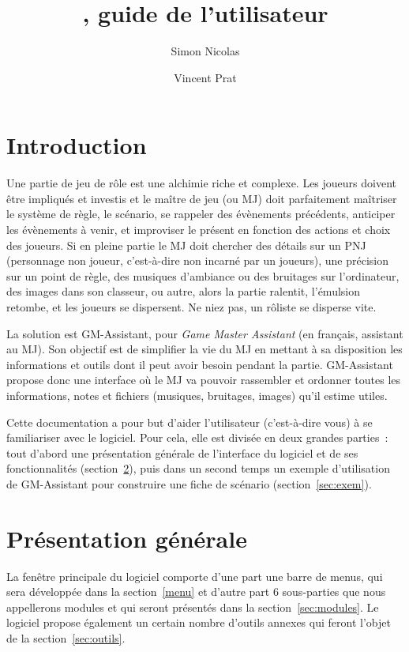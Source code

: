 \documentclass[a4paper,12pt]{article}
\title{\GMA \versionnumber, guide de l'utilisateur}
\author{Simon Nicolas \and Vincent Prat}
\newcommand*{\GMA}{GM-Assistant\xspace}
\begin{document}
\maketitle

\tableofcontents

\section{Introduction}

Une partie de jeu de rôle est une alchimie riche et complexe.
Les joueurs doivent être impliqués et investis et le maître de jeu (ou MJ) doit parfaitement maîtriser le système de règle, le scénario, se rappeler des évènements précédents, anticiper les évènements à venir, et improviser le présent en fonction des actions et choix des joueurs.
Si en pleine partie le MJ doit chercher des détails sur un PNJ (personnage non joueur, c'est-à-dire non incarné par un joueurs), une précision sur un point de règle, des musiques d'ambiance ou des bruitages sur l'ordinateur, des images dans son classeur, ou autre, alors la partie ralentit, l'émulsion retombe, et les joueurs se dispersent.
Ne niez pas, un rôliste se disperse vite.

La solution est \GMA, pour \emph{Game Master Assistant} (en français, assistant au MJ).
Son objectif est de simplifier la vie du MJ en mettant à sa disposition les informations et outils dont il peut avoir besoin pendant la partie.
\GMA propose donc une interface où le MJ va pouvoir rassembler et ordonner toutes les informations, notes et fichiers (musiques, bruitages, images) qu'il estime utiles.

Cette documentation a pour but d'aider l'utilisateur (c'est-à-dire vous) à se familiariser avec le logiciel.
Pour cela, elle est divisée en deux grandes parties~: tout d'abord une présentation générale de l'interface du logiciel et de ses fonctionnalités (section~\ref{sec:pres}), puis dans un second temps un exemple d'utilisation de \GMA pour construire une fiche de scénario (section~\ref{sec:exem}).

\section{Présentation générale}
\label{sec:pres}

La fenêtre principale du logiciel comporte d'une part une barre de menus, qui sera développée dans la section~\ref{menu} et d'autre part 6 sous-parties que nous appellerons modules et qui seront présentés dans la section~\ref{sec:modules}.
Le logiciel propose également un certain nombre d'outils annexes qui feront l'objet de la section~\ref{sec:outils}.
\end{document}
